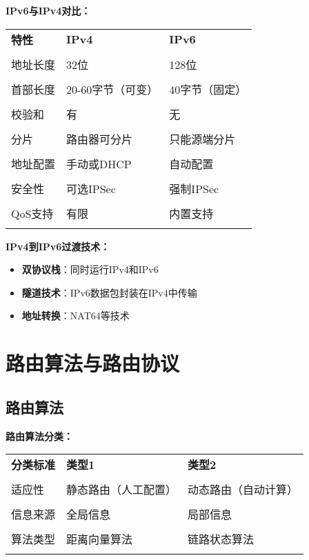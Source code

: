 \documentclass[lang=cn,newtx,10pt,scheme=chinese]{../../elegantbook}
\begin{document}
\textbf{IPv6与IPv4对比：}
\begin{longtable}{@{}p{3cm}p{5cm}p{5cm}@{}}
\toprule
\textbf{特性} & \textbf{IPv4} & \textbf{IPv6} \\\\ \midrule
\endhead

地址长度 & 32位 & 128位 \\\\
首部长度 & 20-60字节（可变） & 40字节（固定） \\\\
校验和 & 有 & 无 \\\\
分片 & 路由器可分片 & 只能源端分片 \\\\
地址配置 & 手动或DHCP & 自动配置 \\\\
安全性 & 可选IPSec & 强制IPSec \\\\
QoS支持 & 有限 & 内置支持 \\\\

\bottomrule
\end{longtable}

\textbf{IPv4到IPv6过渡技术：}
\begin{itemize}
  \item \textbf{双协议栈}：同时运行IPv4和IPv6
  \item \textbf{隧道技术}：IPv6数据包封装在IPv4中传输
  \item \textbf{地址转换}：NAT64等技术
\end{itemize}

\section{路由算法与路由协议}

\subsection{路由算法}

\textbf{路由算法分类：}
\begin{longtable}{@{}p{3cm}p{5cm}p{5cm}@{}}
\toprule
\textbf{分类标准} & \textbf{类型1} & \textbf{类型2} \\\\ \midrule
\endhead

适应性 & 静态路由（人工配置） & 动态路由（自动计算） \\\\
信息来源 & 全局信息 & 局部信息 \\\\
算法类型 & 距离向量算法 & 链路状态算法 \\\\

\bottomrule
\end{longtable}
\end{document}
